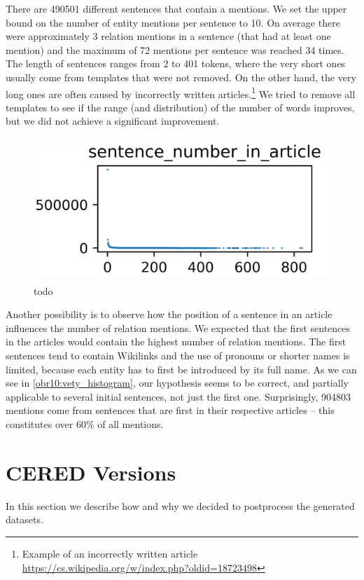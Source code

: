 There are \num{490501} different sentences that contain a mentions. We set the upper bound on the number of entity mentions per sentence to 10. On average there were approximately 3 relation mentions in a sentence (that had at least one mention) and the maximum of 72 mentions per sentence was reached 34 times. The length of sentences ranges from 2 to 401 tokens, where the very short ones usually come from templates that were not removed. On the other hand, the very long ones are often caused by incorrectly written articles.\footnote{Example of an incorrectly written article \url{https://cs.wikipedia.org/w/index.php?oldid=18723498}} We tried to remove all templates to see if the range (and distribution) of the number of words improves, but we did not achieve a significant improvement.



\begin{figure}[h]\centering
\includegraphics[width=119mm, height=54mm]{./img/CERED0_sentence_number_histogram}
\caption{todo}
\label{obr10:vety_histogram}
\end{figure}


Another possibility is to observe how the position of a sentence in an article influences the number of relation mentions. We expected that the first sentences in the articles would contain the highest number of relation mentions. The first sentences tend to contain Wikilinks and the use of pronouns or shorter names is limited, because each entity has to first be introduced by its full name. As we can see in \autoref{obr10:vety_histogram}, our hypothesis seems to be correct, and partially applicable to several initial sentences, not just the first one. Surprisingly, \num{904803} mentions come from sentences that are first in their respective articles -- this constitutes over 60\% of all mentions.





\section{CERED Versions}
In this section we describe how and why we decided to postprocess the generated datasets. 

